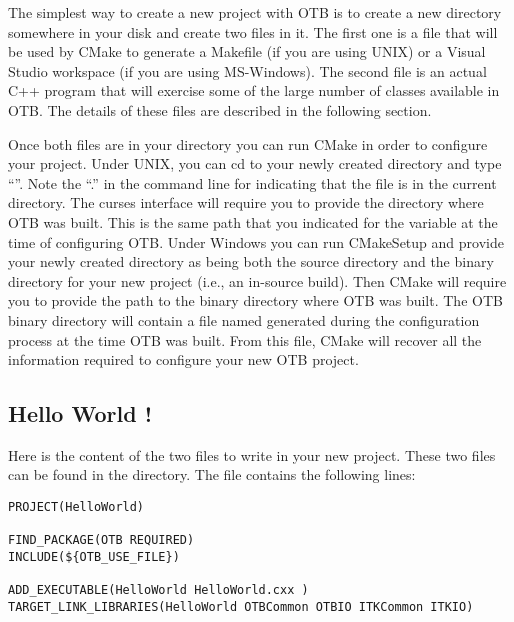 The simplest way to create a new project with OTB is to create a new directory
somewhere in your disk and create two files in it. The first one is a
 file that will be used by CMake to generate a Makefile
(if you are using UNIX) or a Visual Studio workspace (if you are using
MS-Windows).  The second file is an actual C++ program that will exercise
some of the large number of classes available in OTB. The details of these files
are described in the following section.

Once both files are in your directory you can run CMake in order to configure
your project. Under UNIX, you can cd to your newly created directory
and type ``''. Note the ``.'' in the command line for indicating
that the  file is in the current directory. The
curses interface will require you to provide the directory where OTB
was built. This is the same path that you indicated for the
 variable at the time of configuring OTB. Under
Windows you can run CMakeSetup and provide your newly created
directory as being both the source directory and the binary directory for
your new project (i.e., an in-source build). Then CMake will require you to
provide the path to the binary directory where OTB was built. The OTB binary
directory will contain a file named  generated during the
configuration process at the time OTB was built.  From this file, CMake will
recover all the information required to configure your new OTB project.


\subsection{Hello World !}
\label{sec:HelloWorldOTB}


Here is the content of the two files to write in your new project. These two
files can be found in the  directory. The
 file contains the following lines:

\small
\begin{verbatim}
PROJECT(HelloWorld)

FIND_PACKAGE(OTB REQUIRED)
INCLUDE(${OTB_USE_FILE})

ADD_EXECUTABLE(HelloWorld HelloWorld.cxx )
TARGET_LINK_LIBRARIES(HelloWorld OTBCommon OTBIO ITKCommon ITKIO)
\end{verbatim}

\normalsize

